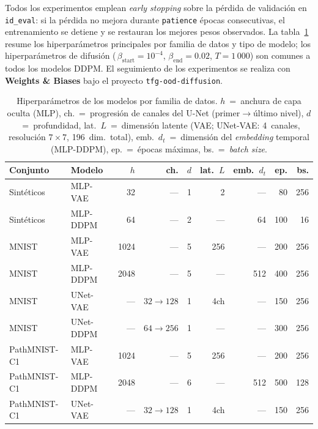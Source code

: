 Todos los experimentos emplean \textit{early stopping} sobre la pérdida de validación
en \texttt{id\_eval}: si la pérdida no mejora durante \texttt{patience} épocas
consecutivas, el entrenamiento se detiene y se restauran los mejores pesos observados.
La tabla~\ref{tab:hparams} resume los hiperparámetros principales por familia de datos
y tipo de modelo; los hiperparámetros de difusión (\,$\beta_{\mathrm{start}}{=}10^{-4}$,
$\beta_{\mathrm{end}}{=}0.02$, $T{=}1\,000$) son comunes a todos los modelos DDPM.
El seguimiento de los experimentos se realiza con \textbf{Weights \&
Biases} bajo el proyecto \texttt{tfg-ood-diffusion}.

\begin{table}[htbp]
    \centering
    \caption{Hiperparámetros de los modelos por familia de datos. $h$~=~anchura
             de capa oculta (MLP), ch.~=~progresión de canales del U-Net
             (primer$\to$último nivel), $d$~=~profundidad, lat.~$L$~=~dimensión
             latente (VAE; UNet-VAE: 4~canales, resolución $7{\times}7$,
             196~dim.\ total), emb.~$d_t$~=~dimensión del \textit{embedding}
             temporal (MLP-DDPM), ep.~=~épocas máximas, bs.~=~\textit{batch size}.}
    \label{tab:hparams}
    \begin{tabular}{llrrrrrrr}
        \toprule
        Conjunto & Modelo & $h$ & ch. & $d$ & lat.~$L$ & emb.~$d_t$ & ep. & bs. \\
        \midrule
        Sintéticos        & MLP-VAE   & 32    & —              & 1 & 2    & —   & 80  & 256 \\
        Sintéticos        & MLP-DDPM  & 64    & —              & 2 & —    & 64  & 100 & 16  \\
        \midrule
        MNIST             & MLP-VAE   & 1024  & —              & 5 & 256  & —   & 200 & 256 \\
        MNIST             & MLP-DDPM  & 2048  & —              & 5 & —    & 512 & 400 & 256 \\
        MNIST             & UNet-VAE  & —     & $32{\to}128$   & 1 & 4ch  & —   & 150 & 256 \\
        MNIST             & UNet-DDPM & —     & $64{\to}256$   & 1 & —    & —   & 300 & 256 \\
        \midrule
        PathMNIST-C1      & MLP-VAE   & 1024  & —              & 5 & 256  & —   & 200 & 256 \\
        PathMNIST-C1      & MLP-DDPM  & 2048  & —              & 6 & —    & 512 & 500 & 128 \\
        PathMNIST-C1      & UNet-VAE  & —     & $32{\to}128$   & 1 & 4ch  & —   & 150 & 256 \\

\end{tabular}
\end{table}
